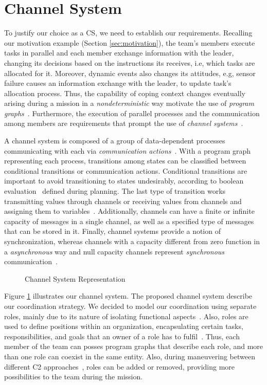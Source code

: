 \section{Channel System}
\label{sec:channelSystem}

To justify our choice as a CS, we need to establish our requirements. Recalling our motivation example (Section \ref{sec:motivation}), the team's members execute tasks in parallel and each member exchange information with the leader, changing its decisions based on the instructions its receives, i.e, which tasks are allocated for it. Moreover, dynamic events also changes its attitudes, e.g, sensor failure causes an information exchange with the leader, to update task's allocation process. Thus, the capability of coping context changes eventually arising during a mission in a \textit{nondeterministic} way motivate the use of \textit{program graphs}~\cite{modelcheckingBaier}. Furthermore, the execution of parallel processes and the communication among members are requirements that prompt the use of \textit{channel systems}~\cite{modelcheckingBaier}.

A channel system is composed of a group of data-dependent processes communicating with each via \textit{communication actions}~\cite{modelcheckingBaier}. With a program graph representing each process, transitions among states can be classified between conditional transitions or communication actions. Conditional transitions are important to avoid transitioning to states undesirably, according to boolean evaluation~\cite{modelcheckingBaier} defined during planning. The last type of transition works transmitting values through channels or receiving values from channels and assigning them to variables~\cite{modelcheckingBaier}. Additionally, channels can have a finite or infinite capacity of messages in a single channel, as well as a specified type of messages that can be stored in it. Finally, channel systems provide a notion of synchronization, whereas channels with a capacity different from zero function in a \textit{asynchronous} way and null capacity channels represent \textit{synchronous} communication~\cite{modelcheckingBaier}.

\begin{figure}[!ht]
    \centering
    \scalebox{.75}{}
    \caption{Channel System Representation}
    \label{fig:CS}
\end{figure}

Figure \ref{fig:CS} illustrates our channel system. The proposed channel system describe our coordination strategy. We decided to model our coordination using separate roles, mainly due to its nature of isolating functional aspects~\cite{roleOrientedModeling}. Also, roles are used to define positions within an organization, encapsulating certain tasks, responsibilities, and goals that an owner of a role has to fulfil~\cite{roleOrientedModeling}. Thus, each member of the team can posses program graphs that describe each role, and more than one role can coexist in the same entity. Also, during maneuvering between different C2 approaches~\cite{france2014}, roles can be added or removed, providing more possibilities to the team during the mission.

